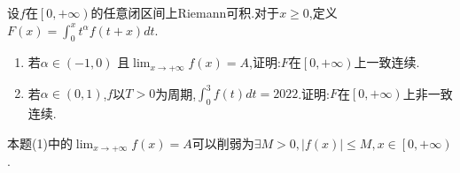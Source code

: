 \documentclass[lang=cn,newtx,10pt,scheme=chinese]{../Template/elegantbook}
\begin{document}
\begin{example}
设$f$在$\left[ 0,+\infty \right)$的任意闭区间上Riemann可积.对于$x\geqslant 0$,定义$F\left( x \right) =\int_0^x{t^{\alpha}}f\left( t+x \right) dt$.
\begin{enumerate}[(1)]
\item 若$\alpha \in \left( -1,0 \right)$ 且$\lim_{x\rightarrow +\infty} f\left( x \right) =A$,证明:$F$在$\left[ 0,+\infty \right) $上一致连续.

\item 若$\alpha \in \left( 0,1 \right)$,$f$以$T>0$为周期,$\int_0^3{f\left( t \right) dt}=2022$.证明:$F$在$\left[ 0,+\infty \right) $上非一致连续.
\end{enumerate}
\end{example}
\begin{note}
本题(1)中的$\lim_{x\rightarrow +\infty} f\left( x \right) =A$可以削弱为$\exists M>0,\left| f\left( x \right) \right|\leqslant M,x\in \left[ 0,+\infty \right) $.
\end{note}
\end{document}
